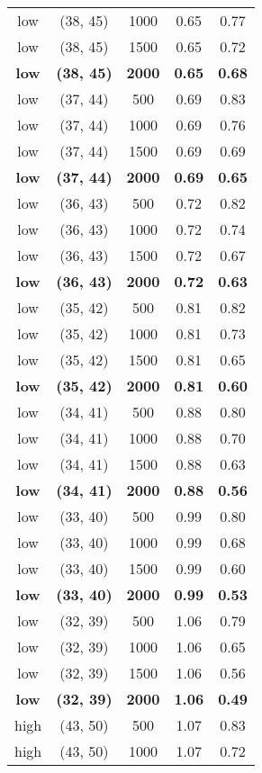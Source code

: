 \begin{tabular}{c c c c c}
low & (38, 45) &  1000 & 0.65 & 0.77 \\
low & (38, 45) &  1500 & 0.65 & 0.72 \\
\textbf{low} & \textbf{(38, 45)} & \textbf{ 2000} & \textbf{0.65} & \textbf{0.68} \\
low & (37, 44) &  500 & 0.69 & 0.83 \\
low & (37, 44) &  1000 & 0.69 & 0.76 \\
low & (37, 44) &  1500 & 0.69 & 0.69 \\
\textbf{low} & \textbf{(37, 44)} & \textbf{ 2000} & \textbf{0.69} & \textbf{0.65} \\
low & (36, 43) &  500 & 0.72 & 0.82 \\
low & (36, 43) &  1000 & 0.72 & 0.74 \\
low & (36, 43) &  1500 & 0.72 & 0.67 \\
\textbf{low} & \textbf{(36, 43)} & \textbf{ 2000} & \textbf{0.72} & \textbf{0.63} \\
low & (35, 42) &  500 & 0.81 & 0.82 \\
low & (35, 42) &  1000 & 0.81 & 0.73 \\
low & (35, 42) &  1500 & 0.81 & 0.65 \\
\textbf{low} & \textbf{(35, 42)} & \textbf{ 2000} & \textbf{0.81} & \textbf{0.60} \\
low & (34, 41) &  500 & 0.88 & 0.80 \\
low & (34, 41) &  1000 & 0.88 & 0.70 \\
low & (34, 41) &  1500 & 0.88 & 0.63 \\
\textbf{low} & \textbf{(34, 41)} & \textbf{ 2000} & \textbf{0.88} & \textbf{0.56} \\
low & (33, 40) &  500 & 0.99 & 0.80 \\
low & (33, 40) &  1000 & 0.99 & 0.68 \\
low & (33, 40) &  1500 & 0.99 & 0.60 \\
\textbf{low} & \textbf{(33, 40)} & \textbf{ 2000} & \textbf{0.99} & \textbf{0.53} \\
low & (32, 39) &  500 & 1.06 & 0.79 \\
low & (32, 39) &  1000 & 1.06 & 0.65 \\
low & (32, 39) &  1500 & 1.06 & 0.56 \\
\textbf{low} & \textbf{(32, 39)} & \textbf{ 2000} & \textbf{1.06} & \textbf{0.49} \\
high & (43, 50) &  500 & 1.07 & 0.83 \\
high & (43, 50) &  1000 & 1.07 & 0.72 \\

\end{tabular}

